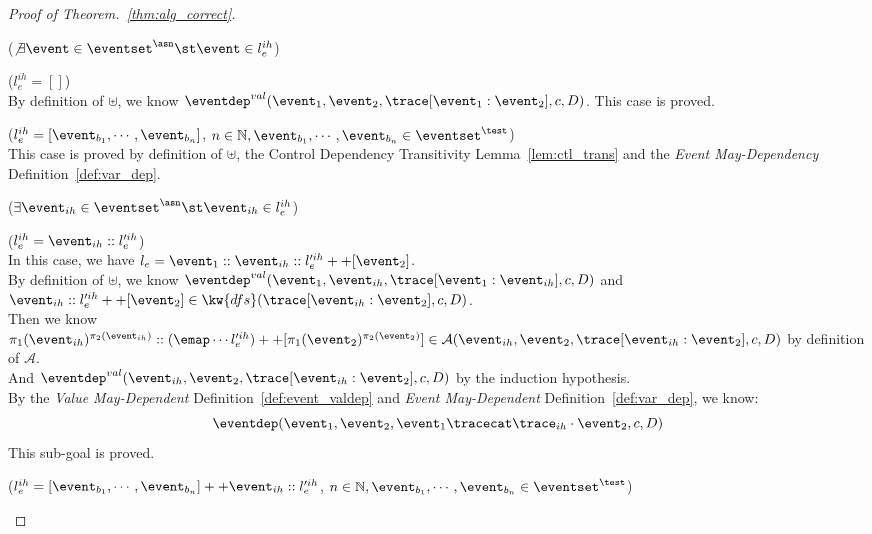 \begin{proof}[Proof of Theorem.~\ref{thm:alg_correct}]
\begin{case}
\begin{subproof}
  ($\not\exists \event \in \eventset^{\asn} \st \event \in l^{ih}_e $)
  \begin{subsubcase}($l^{ih}_e = []$)
    \\
    By definition of $\uplus$, we know $\eventdep^{val}(\event_1, \event_{2}, \trace[\event_1:\event_{2}], c, D)$.
    This case is proved.
      \end{subsubcase}
  \begin{subsubcase}
    \label{case:dep_0asn_ntest}
    ($l^{ih}_e =[\event_{b_1}, \cdots, \event_{b_n}]$, $ n \in \mathbb{N}, \event_{b_1}, \cdots, \event_{b_n} \in \eventset^{\test}$)
    \\
    This case is proved by definition of $\uplus$, the Control Dependency Transitivity Lemma~\ref{lem:ctl_trans} and the \emph{Event May-Dependency} Definition~\ref{def:var_dep}.
  \end{subsubcase}
  ($\exists \event_{ih} \in \eventset^{\asn} \st \event_{ih} \in l^{ih}_e $)
  \begin{subsubcase}
    \label{case:dep_asn_0test}
    ($l^{ih}_e = \event_{ih}::l'^{ih}_e$)
    \\
    In this case, we have $l_e = \event_1::\event_{ih}::l'^{ih}_e ++ [\event_2]$.
\\
By definition of $\uplus$, we know $\eventdep^{val}(\event_1, \event_{ih}, \trace[\event_1:\event_{ih}], c, D)$ and 
$\event_{ih}::l'^{ih}_e ++ [\event_2] \in \kw{dfs}(\trace[\event_{ih}:\event_2], c, D)$.
\\
Then we know $\pi_1(\event_{ih})^{\pi_2(\event_{ih})}:: 
(\emap \cdots l'^{ih}_e) ++ [\pi_1(\event_{2})^{\pi_2(\event_{2})}] \in \mathcal{A}(\event_{ih}, \event_2, \trace[\event_{ih}:\event_2], c, D)$ by definition of $\mathcal{A}$.
\\
And $\eventdep^{val}(\event_{ih}, \event_2, \trace[\event_{ih}:\event_2], c, D)$ by the induction hypothesis.
\\
By the \emph{Value May-Dependent} Definition~\ref{def:event_valdep} and \emph{Event May-Dependent} Definition~\ref{def:var_dep}, we know:
\[
  \eventdep(\event_1, \event_2, \event_1 \tracecat \trace_{ih} \cdot \event_2, {c}, D) 
  \]
This sub-goal is proved.
  \end{subsubcase}
  \begin{subsubcase}($l^{ih}_e =[\event_{b_1}, \cdots, \event_{b_n}]++ \event_{ih}::l'^{ih}_e$, $ n \in \mathbb{N}, \event_{b_1}, \cdots, \event_{b_n} \in \eventset^{\test}$)

\end{subsubcase}
\end{subproof}
\end{case}
\end{proof}
